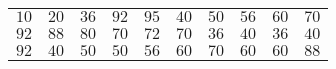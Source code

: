 \normalsize \begin{tabular}{c c c c c c c c c c}

$10$ & $20$ & $36$ & $92$ & $95$ & $40$ & $50$ & $56$ & $60$ & $70$ \\

$92$ & $88$ & $80$ & $70$ & $72$ & $70$ & $36$ & $40$ & $36$ & $40$ \\

$92$ & $40$ & $50$ & $50$ & $56$ & $60$ & $70$ & $60$ & $60$ & $88$ \\

\end{tabular}